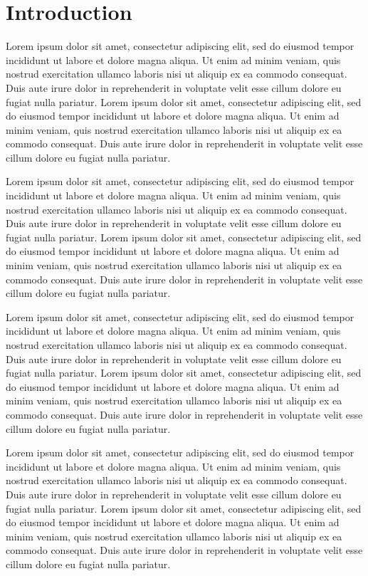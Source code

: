 \documentclass[11pt]{report}
\begin{document}
\chapter{Introduction}
Lorem ipsum dolor sit amet, consectetur adipiscing elit, sed do eiusmod tempor incididunt ut labore et dolore magna aliqua. Ut enim ad minim veniam, quis nostrud exercitation ullamco laboris nisi ut aliquip ex ea commodo consequat. Duis aute irure dolor in reprehenderit in voluptate velit esse cillum dolore eu fugiat nulla pariatur. Lorem ipsum dolor sit amet, consectetur adipiscing elit, sed do eiusmod tempor incididunt ut labore et dolore magna aliqua. Ut enim ad minim veniam, quis nostrud exercitation ullamco laboris nisi ut aliquip ex ea commodo consequat. Duis aute irure dolor in reprehenderit in voluptate velit esse cillum dolore eu fugiat nulla pariatur.

Lorem ipsum dolor sit amet, consectetur adipiscing elit, sed do eiusmod tempor incididunt ut labore et dolore magna aliqua. Ut enim ad minim veniam, quis nostrud exercitation ullamco laboris nisi ut aliquip ex ea commodo consequat. Duis aute irure dolor in reprehenderit in voluptate velit esse cillum dolore eu fugiat nulla pariatur. Lorem ipsum dolor sit amet, consectetur adipiscing elit, sed do eiusmod tempor incididunt ut labore et dolore magna aliqua. Ut enim ad minim veniam, quis nostrud exercitation ullamco laboris nisi ut aliquip ex ea commodo consequat. Duis aute irure dolor in reprehenderit in voluptate velit esse cillum dolore eu fugiat nulla pariatur.

Lorem ipsum dolor sit amet, consectetur adipiscing elit, sed do eiusmod tempor incididunt ut labore et dolore magna aliqua. Ut enim ad minim veniam, quis nostrud exercitation ullamco laboris nisi ut aliquip ex ea commodo consequat. Duis aute irure dolor in reprehenderit in voluptate velit esse cillum dolore eu fugiat nulla pariatur. Lorem ipsum dolor sit amet, consectetur adipiscing elit, sed do eiusmod tempor incididunt ut labore et dolore magna aliqua. Ut enim ad minim veniam, quis nostrud exercitation ullamco laboris nisi ut aliquip ex ea commodo consequat. Duis aute irure dolor in reprehenderit in voluptate velit esse cillum dolore eu fugiat nulla pariatur.

Lorem ipsum dolor sit amet, consectetur adipiscing elit, sed do eiusmod tempor incididunt ut labore et dolore magna aliqua. Ut enim ad minim veniam, quis nostrud exercitation ullamco laboris nisi ut aliquip ex ea commodo consequat. Duis aute irure dolor in reprehenderit in voluptate velit esse cillum dolore eu fugiat nulla pariatur. Lorem ipsum dolor sit amet, consectetur adipiscing elit, sed do eiusmod tempor incididunt ut labore et dolore magna aliqua. Ut enim ad minim veniam, quis nostrud exercitation ullamco laboris nisi ut aliquip ex ea commodo consequat. Duis aute irure dolor in reprehenderit in voluptate velit esse cillum dolore eu fugiat nulla pariatur.
\end{document}
